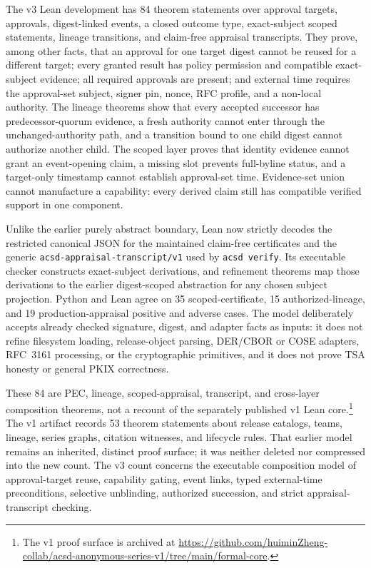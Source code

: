 \documentclass[11pt]{article}
\begin{document}
The v3 Lean development has 84 theorem statements over approval targets,
approvals, digest-linked events, a closed outcome type, exact-subject scoped
statements, lineage transitions, and claim-free appraisal transcripts. They
prove, among other facts, that an approval for one target digest cannot be
reused for a different target; every granted result has policy permission and
compatible exact-subject evidence; all required approvals are present; and
external time requires the approval-set subject, signer pin, nonce, RFC profile,
and a non-local authority. The lineage theorems show that every accepted
successor has predecessor-quorum evidence, a fresh authority cannot enter
through the unchanged-authority path, and a transition bound to one child
digest cannot authorize another child. The scoped layer proves that identity
evidence cannot grant an event-opening claim, a missing slot prevents
full-byline status, and a target-only timestamp cannot establish approval-set
time. Evidence-set union cannot manufacture a capability: every derived claim
still has compatible verified support in one component.

Unlike the earlier purely abstract boundary, Lean now strictly decodes the
restricted canonical JSON for the maintained claim-free certificates and the
generic \texttt{acsd-appraisal-transcript/v1} used by \texttt{acsd verify}.
Its executable checker constructs exact-subject derivations, and refinement
theorems map those derivations to the earlier digest-scoped abstraction for any
chosen subject projection. Python and Lean agree on 35 scoped-certificate, 15
authorized-lineage, and 19 production-appraisal positive and adverse cases.
The model deliberately accepts already checked signature, digest, and adapter
facts as inputs: it does not refine filesystem loading, release-object parsing,
DER/CBOR or COSE adapters, RFC~3161 processing, or the cryptographic primitives,
and it does not prove TSA honesty or general PKIX correctness.

These 84 are PEC, lineage, scoped-appraisal, transcript, and cross-layer
composition theorems, not a recount of the separately published v1 Lean core.\footnote{The v1 proof surface is archived at
\url{https://github.com/huiminZheng-collab/acsd-anonymous-series-v1/tree/main/formal-core}.}
The v1 artifact records 53 theorem statements
about release catalogs, teams, lineage, series graphs, citation witnesses, and
lifecycle rules. That earlier model remains an inherited, distinct proof
surface; it was neither deleted nor compressed into the new count. The v3
count concerns the executable composition model of approval-target reuse,
capability gating, event links, typed external-time preconditions, selective
unblinding, authorized succession, and strict appraisal-transcript checking.
\end{document}

